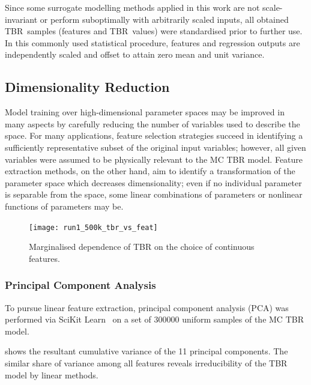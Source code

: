 Since some surrogate modelling methods applied in this work are not scale-invariant or
perform suboptimally with arbitrarily scaled inputs, all obtained TBR~samples
(features and TBR~values) were standardised prior to further use. In this
commonly used statistical procedure, features and regression outputs are
independently scaled and offset to attain zero mean and unit variance.



\subsection{Dimensionality Reduction}
\label{sec:dimred}


Model training over high-dimensional parameter spaces may be improved in many
aspects by carefully reducing the number of variables used to describe the
space. For many applications, feature selection strategies succeed in
identifying a sufficiently representative subset of the original input
variables; however, all given variables were assumed to be physically relevant
to the MC TBR model. Feature extraction methods, on the other hand, aim to
identify a transformation of the parameter space which decreases dimensionality; even if no individual parameter is separable from the space, some linear combinations of parameters or nonlinear functions of parameters may be.

\begin{figure}[h]
	\centering
	\texttt{[image: run1\_500k\_tbr\_vs\_feat]}
	\caption{Marginalised dependence of TBR on the choice of continuous
	features.}
  \label{fig:tbr-vs-features}
\end{figure}


\subsubsection{Principal Component Analysis}

To pursue linear feature extraction, principal component analysis (PCA)
\cite{Jolliffe2016} was performed via SciKit Learn~\cite{scikit-learn} on a set
of \num{300000} uniform samples of the MC TBR model. %

 shows the resultant cumulative variance of the 11 principal components. The similar share of variance among all features
reveals irreducibility of the TBR model by linear methods.

